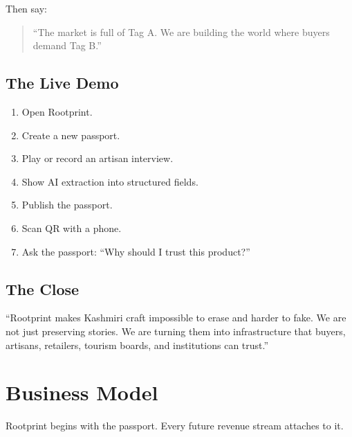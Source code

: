 \documentclass[11pt,a4paper]{article}
\begin{document}
Then say:

\begin{quote}
``The market is full of Tag A. We are building the world where buyers demand Tag B.''
\end{quote}

\subsection{The Live Demo}

\begin{enumerate}
  \item Open Rootprint.
  \item Create a new passport.
  \item Play or record an artisan interview.
  \item Show AI extraction into structured fields.
  \item Publish the passport.
  \item Scan QR with a phone.
  \item Ask the passport: ``Why should I trust this product?''
\end{enumerate}

\subsection{The Close}

\begin{blackbox}
``Rootprint makes Kashmiri craft impossible to erase and harder to fake. We are not just preserving stories. We are turning them into infrastructure that buyers, artisans, retailers, tourism boards, and institutions can trust.''
\end{blackbox}

\section{Business Model}

Rootprint begins with the passport. Every future revenue stream attaches to it.
\end{document}
